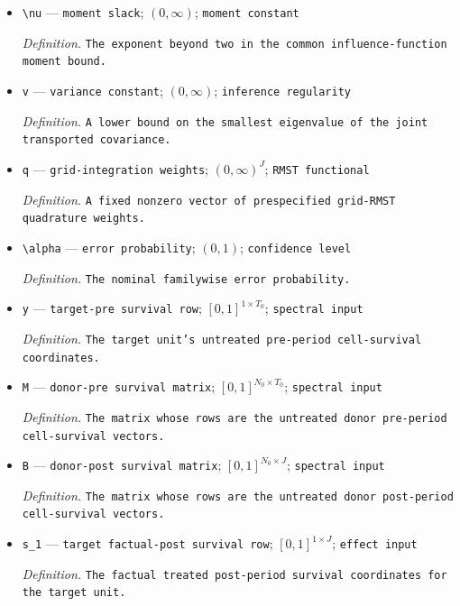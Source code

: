 \documentclass{article}
\begin{document}
\begin{itemize}
  \item \texttt{\textbackslash{}\allowbreak{}nu} --- \texttt{moment slack}; \((0,\infty)\); \texttt{moment constant}
  \par\smallskip\noindent\emph{Definition.} \texttt{The exponent beyond two in the common influence-\allowbreak{}function moment bound.}
  \item \texttt{v} --- \texttt{variance constant}; \((0,\infty)\); \texttt{inference regularity}
  \par\smallskip\noindent\emph{Definition.} \texttt{A lower bound on the smallest eigenvalue of the joint transported covariance.}
  \item \texttt{q} --- \texttt{grid-\allowbreak{}integration weights}; \((0,\infty)^J\); \texttt{RMST functional}
  \par\smallskip\noindent\emph{Definition.} \texttt{A fixed nonzero vector of prespecified grid-\allowbreak{}RMST quadrature weights.}
  \item \texttt{\textbackslash{}\allowbreak{}alpha} --- \texttt{error probability}; \((0,1)\); \texttt{confidence level}
  \par\smallskip\noindent\emph{Definition.} \texttt{The nominal familywise error probability.}
  \item \texttt{y} --- \texttt{target-\allowbreak{}pre survival row}; \([0,1]^{1\times T_0}\); \texttt{spectral input}
  \par\smallskip\noindent\emph{Definition.} \texttt{The target unit's untreated pre-\allowbreak{}period cell-\allowbreak{}survival coordinates.}
  \item \texttt{M} --- \texttt{donor-\allowbreak{}pre survival matrix}; \([0,1]^{N_0\times T_0}\); \texttt{spectral input}
  \par\smallskip\noindent\emph{Definition.} \texttt{The matrix whose rows are the untreated donor pre-\allowbreak{}period cell-\allowbreak{}survival vectors.}
  \item \texttt{B} --- \texttt{donor-\allowbreak{}post survival matrix}; \([0,1]^{N_0\times J}\); \texttt{spectral input}
  \par\smallskip\noindent\emph{Definition.} \texttt{The matrix whose rows are the untreated donor post-\allowbreak{}period cell-\allowbreak{}survival vectors.}
  \item \texttt{s\_\allowbreak{}1} --- \texttt{target factual-\allowbreak{}post survival row}; \([0,1]^{1\times J}\); \texttt{effect input}
  \par\smallskip\noindent\emph{Definition.} \texttt{The factual treated post-\allowbreak{}period survival coordinates for the target unit.}

\end{itemize}
\end{document}
